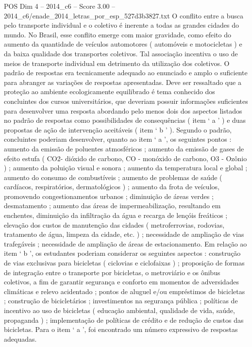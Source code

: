 \begin{textsample}{POS Dim 4 – 2014\_c6 – Score 3.00 – 2014\_c6/enade\_2014\_letras\_por\_esp\_527d3b3827.txt}
O conflito entre a busca pelo transporte individual e o coletivo é inerente a todas as grandes cidades do mundo.
No Brasil, esse conflito emerge com maior gravidade, como efeito do aumento da quantidade de veículos automotores ( automóveis e motocicletas ) e da baixa qualidade dos transportes coletivos.
Tal associação incentiva o uso de meios de transporte individual em detrimento da utilização dos coletivos.
O padrão de respostas era tecnicamente adequado ao enunciado e amplo o suficiente para abranger as variações de respostas apresentadas.
Deve ser ressaltado que a proteção ao ambiente ecologicamente equilibrado é tema conhecido dos concluintes dos cursos universitários, que deveriam possuir informações suficientes para desenvolver uma resposta abordando pelo menos dois dos aspectos listados no padrão de respostas como possibilidades de consequências ( item ‘ a ’ ) e duas propostas de ação de intervenção aceitáveis ( item ‘ b ’ ).
Segundo o padrão, concluintes poderiam desenvolver, quanto ao item ‘ a ’, os seguintes pontos : aumento da emissão de poluentes atmosféricos ; aumento da emissão de gases de efeito estufa ( CO2- dióxido de carbono, CO - monóxido de carbono, O3 - Ozônio ) ; aumento da poluição visual e sonora ; aumento da temperatura local e global ; aumento do consumo de combustíveis ; aumento de problemas de saúde ( cardíacos, respiratórios, dermatológicos ) ; aumento da frota de veículos, promovendo congestionamentos urbanos ; diminuição de áreas verdes ; desmatamento ; aumento das áreas de impermeabilização, resultando em enchentes, diminuição da infiltração da água e recarga de lençóis freáticos ; elevação dos custos de manutenção das cidades ( metroferrovias, rodovias, tratamento de água, limpeza da cidade, etc. ) ; necessidade de ampliação de vias trafegáveis ; necessidade de ampliação de áreas de estacionamento.
Em relação ao item ‘ b ’, os estudantes poderiam considerar os seguintes aspectos : construção de vias exclusivas para bicicletas ( ciclovias e ciclofaixas ) ; proposição de formas de integração entre o transporte por bicicletas, o metroviário e os ônibus coletivos, a fim de garantir segurança e conforto em momentos de adversidades climáticas e relevo acidentado ; pontos de aluguel e/ou empréstimos de bicicletas ; construção de bicicletários ; investimentos na segurança pública ; políticas de incentivo ao uso de bicicletas ( educação ambiental, qualidade de vida, saúde, propaganda ) ; implementação de políticas de crédito e de redução de custos das bicicletas.
Para o item ‘ a ’, foi encontrado um número expressivo de respostas adequadas.

\end{textsample}
